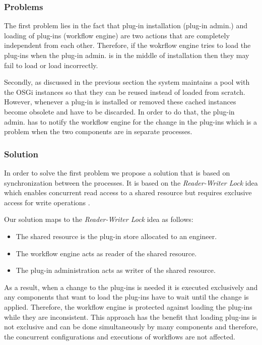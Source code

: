 \subsubsection{Problems}

The first problem lies in the fact that plug-in installation (plug-in admin.) and loading of plug-ins (workflow engine) are two actions that are completely independent from each other. Therefore, if the wokrflow engine tries to load the plug-ins when the plug-in admin. is in the middle of installation then they may fail to load or load incorrectly. 

Secondly, as discussed in the previous section the system maintains a pool with the OSGi instances so that they can be reused instead of loaded from scratch. However, whenever a plug-in is installed or removed these cached instances become obsolete and have to be discarded. In order to do that, the plug-in admin. has to notify the workflow engine for the change in the plug-ins which is a problem when the two components are in separate processes.

\subsubsection{Solution}

In order to solve the first problem we propose a solution that is based on synchronization between the processes. It is based on the \textit{Reader-Writer Lock} idea which enables concurrent read access to a shared resource but requires exclusive access for write operations \cite{lev2009scalable}.

Our solution maps to the \textit{Reader-Writer Lock} idea as follows:
\begin{itemize}
	\item The shared resource is the plug-in store allocated to an engineer.
	\item The workflow engine acts as reader of the shared resource.
	\item The plug-in administration acts as writer of the shared resource.
\end{itemize}

As a result, when a change to the plug-ins is needed it is executed exclusively and any components that want to load the plug-ins have to wait until the change is applied. Therefore, the workflow engine is protected against loading the plug-ins while they are inconsistent. This approach has the benefit that loading plug-ins is not exclusive and can be done simultaneously by many components and therefore, the concurrent configurations and executions of workflows are not affected. 

